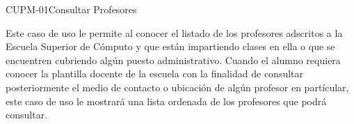 \begin{UseCase}{CUPM-01}{Consultar Profesores}
	{
		Este caso de uso le permite al  conocer el listado de los profesores adscritos a la Escuela Superior de Cómputo y que están impartiendo clases en ella o que se encuentren cubriendo algún puesto administrativo.
		Cuando el alumno requiera conocer la plantilla docente de la escuela con la finalidad de consultar posteriormente el medio de contacto o ubicación de algún profesor en partícular, este caso de uso le mostrará una lista ordenada de los profesores que podrá consultar. 
			
		}
		
		
		

\end{UseCase}
